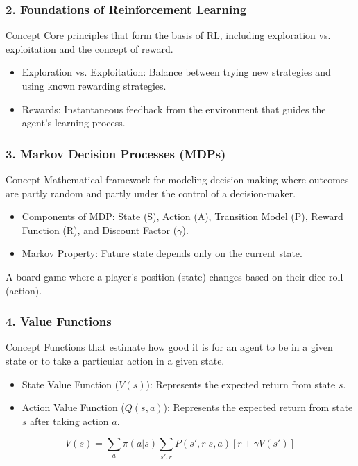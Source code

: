 \documentclass{beamer}
\begin{document}
\begin{frame}[fragile]
    \frametitle{2. Foundations of Reinforcement Learning}
    \begin{block}{Concept}
        Core principles that form the basis of RL, including exploration vs. exploitation and the concept of reward.
    \end{block}
    \begin{itemize}
        \item Exploration vs. Exploitation: Balance between trying new strategies and using known rewarding strategies.
        \item Rewards: Instantaneous feedback from the environment that guides the agent's learning process.
    \end{itemize}
    \begin{figure}
        \centering
    \end{figure}
\end{frame}

\begin{frame}[fragile]
    \frametitle{3. Markov Decision Processes (MDPs)}
    \begin{block}{Concept}
        Mathematical framework for modeling decision-making where outcomes are partly random and partly under the control of a decision-maker.
    \end{block}
    \begin{itemize}
        \item Components of MDP: State (S), Action (A), Transition Model (P), Reward Function (R), and Discount Factor ($\gamma$).
        \item Markov Property: Future state depends only on the current state.
    \end{itemize}
    \begin{example}
        A board game where a player's position (state) changes based on their dice roll (action).
    \end{example}
\end{frame}

\begin{frame}[fragile]
    \frametitle{4. Value Functions}
    \begin{block}{Concept}
        Functions that estimate how good it is for an agent to be in a given state or to take a particular action in a given state.
    \end{block}
    \begin{itemize}
        \item State Value Function ($V(s)$): Represents the expected return from state $s$.
        \item Action Value Function ($Q(s,a)$): Represents the expected return from state $s$ after taking action $a$.
    \end{itemize}
    \begin{equation}
        V(s) = \sum_{a} \pi(a|s) \sum_{s',r} P(s', r | s, a) [r + \gamma V(s')]
    \end{equation}
\end{frame}
\end{document}
